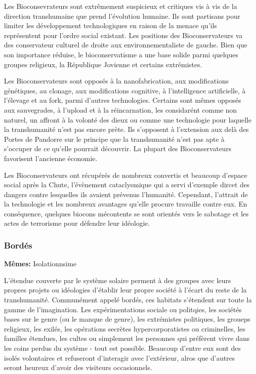 Les Bioconsevrateurs sont extrêmement suspicieux et critiques vis à vis de la direction transhumaine que prend l'évolution humaine. Ils sont partisans pour limiter les développement technologiques en raison de la menace qu'ils représentent pour l'ordre social existant. Les positions des Bioconservateurs va des conservateur culturel de droite aux environnementaliste de gauche. Bien que son importance réduise, le bioconservatisme a une base solide parmi quelques groupes religieux, la République Jovienne et certains extrémistes. 

Les Bioconservateurs sont opposés à la nanofabrication, aux modifications génétiques, au clonage, aux modifications cognitive, à l'intelligence artificielle, à l'élevage et au fork, parmi d'autres technologies. Certains sont mêmes opposés aux sauvegrades, à l'upload et à la réincarnation, les considarént comme non naturel, un affront à la volonté des dieux ou comme une technologie pour laquelle la transhumanité n'est pas encore prète. Ils s'opposent à l'extension aux delà des Portes de Pandorre sur le principe que la transhumanité n'est pas apte à s'occuper de ce qu'elle pourrait découvrir. La plupart des Bioconservateurs favorisent l'ancienne économie. 

Les Bioconservateurs ont récupérés de nombreux convertis et beaucoup d'espace social après la Chute, l'évènement cataclysmique qui a servi d'exemple dircet des dangers contre lesquelles ils avaient prévenus l'humanité. Cependant, l'attrait de la technologie et les nombreux avantages qu'elle procure travaille contre eux. En conséquence, quelques biocons mécontents se sont orientés vers le sabotage et les actes de terrorisme pour défendre leur idéologie. 

\subsubsection{Bordés} \label{sec:brinkers} 

\textbf{Mêmes:} Isolationnsime 

L'étendue couverte par le système solaire perment à des groupes avec leurs propres projets ou idéologies d'établir leur propre société à l'écart du reste de la transhumanité. Communément appelé bordés, ces habitats s'étendent sur toute la gamme de l'imagination. Les expérimentations sociale ou politqies, les sociétés bases sur le genre (ou le manque de genre), les extrémistes politiques, les groueps religieux, les exilés, les opérations secrètes hypercorporatistes ou criminelles, les familles étendues, les cultes ou simplement les personnes qui préfèrent vivre dans les coins perdus du système - tout est possible. Beaucoup d'entre eux sont des isolés volontaires et refuseront d'interagir avec l'extérieur, alros que d'autres seront heureux d'avoir des visiteurs occasionnels. 

